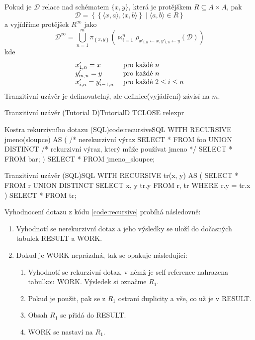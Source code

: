 Pokud je $\mathcal{D}$ relace nad schématem $\lbrace x, y \rbrace$, která je protějškem $R \subseteq A \times A$, pak
$$
\mathcal{D} = \left\{ \left\{ \langle x, a \rangle, \langle x, b \rangle \right\} \; | \; \langle a, b \rangle \in R \right\}
$$
a vyjídříme protějšek $R^{\infty}$ jako
$$
\mathcal{D}^{\infty} = \bigcup_{n = 1}^{m} \pi_{\left\{ x, y \right\}} \left( \Join_{i = 1}^{n} \rho _{x'_{i, n} \leftarrow x, y'_{i, n} \leftarrow y}(\mathcal{D}) \right)
$$
kde
$$
\begin{array}{l l}
x'_{1, n} = x & \text{ pro každé } n \\
y'_{m, n} = y & \text{ pro každé } n \\
x'_{i, n} = y'_{i-1,n} & \text{ pro každé } 2 \leq i \leq n
\end{array}
$$
Tranzitivní uzávěr je definovatelný, ale definice(vyjádření) závisí na $m$.
\begin{upcode}{Tranzitivní uzávěr (Tutorial D)}{}{TutorialD}
TCLOSE relexpr
\end{upcode}
\begin{upcode}{Kostra rekurzivního dotazu (SQL)}{code:recursive}{SQL}
WITH RECURSIVE jmeno(sloupce) AS (
	/* nerekurzivní výraz
	SELECT	*
	FROM	foo
	UNION	DISTINCT
	/* rekurzivní výraz, který může používat jmeno */
	SELECT	*
	FROM 	bar;
)
SELECT	*
FROM	jmeno_sloupce;
\end{upcode}
\begin{upcode}{Tranzitivní uzávěr (SQL)}{}{SQL}
WITH RECURSIVE tr(x, y) AS (
	SELECT	*
	FROM 	r
	UNION	DISTINCT
	SELECT	x, y tr.y FROM r, tr
	WHERE	r.y = tr.x
)
SELECT * FROM tr;
\end{upcode}
Vyhodnocení dotazu z kódu \ref{code:recursive} probíhá následovně:
\begin{enumerate}
\item Vyhodnotí se nerekurzivní dotaz a jeho výsledky se uloží do dočasných tabulek RESULT a WORK.
\item Dokud je WORK neprázdná, tak se opakuje následující:
\begin{enumerate}
\item Vyhodnotí se rekurzivní dotaz, v němž je self reference nahrazena tabulkou WORK. Výsledek si označme $R_{1}$.
\item Pokud je použit, pak se z $R_{1}$ ostraní duplicity a vše, co už je v RESULT.
\item Obsah $R_{1}$ se přidá do RESULT.
\item WORK se nastaví na $R_{1}$.
\end{enumerate}
\end{enumerate}